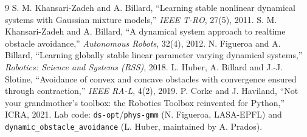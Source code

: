 ﻿\documentclass[10pt,a4paper]{article}
\begin{document}
\small
\begin{thebibliography}{9}\setlength{\itemsep}{0pt}
 S. M. Khansari-Zadeh and A. Billard, ``Learning stable nonlinear dynamical systems with Gaussian mixture models,'' \emph{IEEE T-RO}, 27(5), 2011.
 S. M. Khansari-Zadeh and A. Billard, ``A dynamical system approach to realtime obstacle avoidance,'' \emph{Autonomous Robots}, 32(4), 2012.
 N. Figueroa and A. Billard, ``Learning globally stable linear parameter varying dynamical systems,'' \emph{Robotics: Science and Systems (RSS)}, 2018.
 L. Huber, A. Billard and J.-J. Slotine, ``Avoidance of convex and concave obstacles with convergence ensured through contraction,'' \emph{IEEE RA-L}, 4(2), 2019.
 P. Corke and J. Haviland, ``Not your grandmother's toolbox: the Robotics Toolbox reinvented for Python,'' ICRA, 2021.
 Lab code: \texttt{ds-opt}/\texttt{phys-gmm} (N. Figueroa, LASA-EPFL) and \texttt{dynamic\_obstacle\_avoidance} (L. Huber, maintained by A. Prados).
\end{thebibliography}
\end{document}
